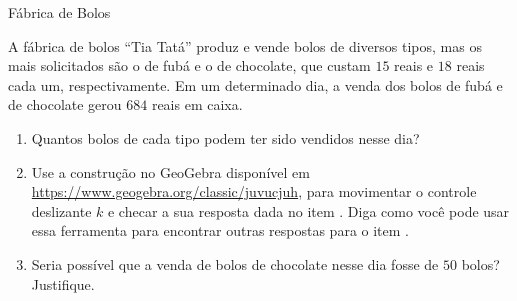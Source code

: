 \clearpage
\begin{task}{Fábrica de Bolos}
\label{bolos}


A fábrica de bolos “Tia Tatá”{} produz e vende bolos de diversos tipos, mas os mais solicitados são o de fubá e o de chocolate, que custam $15$ reais e $18$ reais cada um, respectivamente. Em um determinado dia, a venda dos bolos de fubá e de chocolate gerou $684$ reais em caixa.

\begin{enumerate}

\item{}
Quantos bolos de cada tipo podem ter sido vendidos nesse dia?

\item{}
Use a construção no GeoGebra disponível em \url{https://www.geogebra.org/classic/juvucjuh}, para movimentar o controle deslizante $k$ e checar a sua resposta dada no item . Diga como você pode usar essa ferramenta para encontrar outras respostas para o item .

\item{}
Seria possível que a venda de bolos de chocolate nesse dia fosse de $50$ bolos? Justifique.
\end{enumerate}
\end{task}


